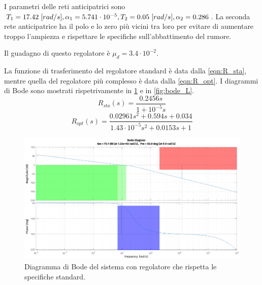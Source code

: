 \documentclass[a4paper]{article}
\begin{document}
I parametri delle reti anticipatrici sono $T_1 = 17.42\hspace{0.3em} [rad/s], \alpha_1 = 5.741 \cdot 10^{-5}, T_2 = 0.05\hspace{0.3em} [rad/s], \alpha_2 = 0.286$.
La seconda rete anticipatrice ha il polo e lo zero più vicini tra loro per evitare di aumentare troppo l'ampiezza e rispettare le specifiche sull'abbattimento del rumore.

Il guadagno di questo regolatore è $\mu_d = 3.4 \cdot 10^{-2}$.

La funzione di trasferimento del regolatore standard è data dalla \cref{eqn:R_sta}, mentre quella del regolatore più complesso è data dalla \cref{eqn:R_opt}.
I diagrammi di Bode sono mostrati rispetrivamente in \cref{fig:bode_L_sta} e in \cref{fig:bode_L}.
\begin{equation}
    \label{eqn:R_sta}
    R_{sta}(s) = \frac{ 0.2456 s}{ 1+  10^{-5} s}
\end{equation}
\begin{equation}
    \label{eqn:R_opt}
    R_{opt}(s) = \frac{0.02961 s^2 + 0.594 s + 0.034}{ 1.43 \cdot 10^{-5} s^2 + 0.0153 s + 1}
\end{equation}

\begin{figure}[h!]
    \centering
    \includegraphics[width=\textwidth]{bode_L_sta}
    \caption{Diagramma di Bode del sistema con regolatore che rispetta le specifiche standard.}
    \label{fig:bode_L_sta}
\end{figure}
\end{document}
